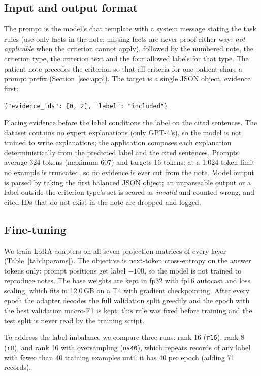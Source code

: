 \documentclass[conference]{IEEEtran}
\begin{document}
\subsection{Input and output format}
The prompt is the model's chat template with a system message stating the task rules (use only facts in the note; missing facts are never proof either way; \emph{not applicable} when the criterion cannot apply), followed by the numbered note, the criterion type, the criterion text and the four allowed labels for that type. The patient note precedes the criterion so that all criteria for one patient share a prompt prefix (Section~\ref{sec:app}). The target is a single JSON object, evidence first:
\begin{center}\small\texttt{\{"evidence\_ids": [0, 2], "label": "included"\}}\end{center}
Placing evidence before the label conditions the label on the cited sentences. The dataset contains no expert explanations (only GPT-4's), so the model is not trained to write explanations; the application composes each explanation deterministically from the predicted label and the cited sentences. Prompts average 324 tokens (maximum 607) and targets 16 tokens; at a 1{,}024-token limit no example is truncated, so no evidence is ever cut from the note. Model output is parsed by taking the first balanced JSON object; an unparseable output or a label outside the criterion type's set is scored as \emph{invalid} and counted wrong, and cited IDs that do not exist in the note are dropped and logged.

\subsection{Fine-tuning}
We train LoRA adapters on all seven projection matrices of every layer (Table~\ref{tab:hparams}). The objective is next-token cross-entropy on the answer tokens only: prompt positions get label $-100$, so the model is not trained to reproduce notes. The base weights are kept in fp32 with fp16 autocast and loss scaling, which fits in 12.0\,GB on a T4 with gradient checkpointing. After every epoch the adapter decodes the full validation split greedily and the epoch with the best validation macro-F1 is kept; this rule was fixed before training and the test split is never read by the training script.

To address the label imbalance we compare three runs: rank 16 (\texttt{r16}), rank 8 (\texttt{r8}), and rank 16 with oversampling (\texttt{os40}), which repeats records of any label with fewer than 40 training examples until it has 40 per epoch (adding 71 records).
\end{document}
